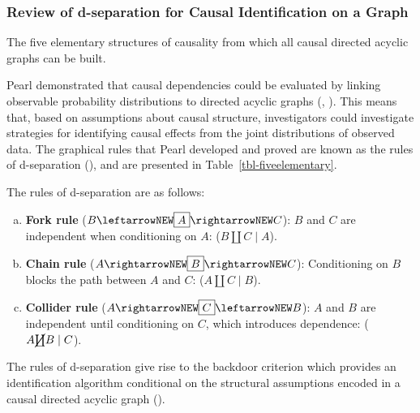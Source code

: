 \documentclass[
  single column]{article}
\begin{document}
\subsubsection{Review of d-separation for Causal Identification on a
Graph}\label{review-of-d-separation-for-causal-identification-on-a-graph}

\begin{table}

\caption{\label{tbl-fiveelementary}The five elementary structures of
causality from which all causal directed acyclic graphs can be built.}

\centering{

\terminologydirectedgraph

}

\end{table}%

Pearl demonstrated that causal dependencies could be evaluated by
linking observable probability distributions to directed acyclic graphs
(, ).
This means that, based on assumptions about causal structure,
investigators could investigate strategies for identifying causal
effects from the joint distributions of observed data. The graphical
rules that Pearl developed and proved are known as the rules of
d-separation (), and are presented
in Table~\ref{tbl-fiveelementary}.

The rules of d-separation are as follows:

\begin{enumerate}[a)]
     \item {\bf Fork rule} ($B \leftarrowNEW \boxed{A} \rightarrowNEW C$): $B$ and $C$ are independent when conditioning on $A$: ($B \coprod C \mid A$).
     \item {\bf Chain rule} ($A \rightarrowNEW \boxed{B} \rightarrowNEW C$): Conditioning on $B$ blocks the path between $A$ and $C$: ($A \coprod C \mid B$).
     \item {\bf Collider rule} ($A \rightarrowNEW \boxed{C} \leftarrowNEW B$): $A$ and $B$ are independent until conditioning on $C$, which introduces dependence: ($A \cancel{\coprod} B \mid C$). 
\end{enumerate}

The rules of d-separation give rise to the backdoor criterion which
provides an identification algorithm conditional on the structural
assumptions encoded in a causal directed acyclic graph
().
\end{document}
